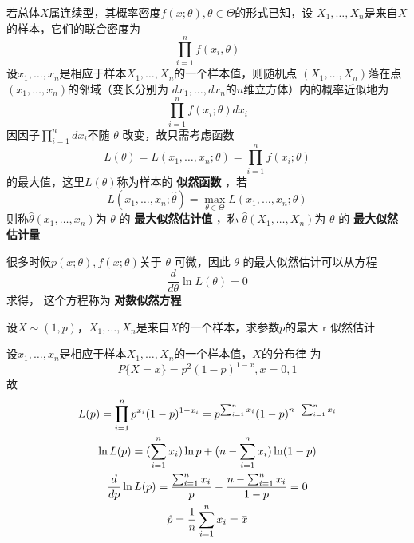 \documentclass[11pt]{article}
\begin{document}
若总体\(X\)属连续型，其概率密度\(f(x;\theta),\theta\in\Theta\)的形式已知，设
\(X_1,\dots,X_n\)是来自\(X\)的样本，它们的联合密度为
\begin{equation*}
\prod_{i=1}^nf(x_i,\theta)
\end{equation*}
设\(x_1,\dots,x_n\)是相应于样本\(X_1,\dots,X_n\)的一个样本值，则随机点
\((X_1,\dots,X_n)\)落在点\((x_1,\dots,x_n)\)的邻域（变长分别为
\(dx_1,\dots,dx_n\)的\(n\)维立方体）内的概率近似地为
\begin{equation*}
\prod_{i=1}^nf(x_i;\theta)dx_i
\end{equation*}
因因子\(\prod_{i=1}^ndx_i\)不随 \(\theta\) 改变，故只需考虑函数
\begin{equation*}
L(\theta)=L(x_1,\dots,x_n;\theta)=\prod_{i=1}^nf(x_i;\theta)
\end{equation*}
的最大值，这里\(L(\theta)\)称为样本的 \textbf{似然函数} ，若
\begin{equation*}
L(x_1,\dots,x_n;\hat{\theta})=\max_{\theta\in\Theta}L(x_1,\dots,x_n;\theta)
\end{equation*}
则称\(\hat{\theta}(x_1,\dots,x_n)\)为 \(\theta\) 的 \textbf{最大似然估计值} ，称
\(\hat{\theta}(X_1,\dots,X_n)\)为 \(\theta\) 的 \textbf{最大似然估计量}

很多时候\(p(x;\theta),f(x;\theta)\)关于 \(\theta\) 可微，因此 \(\theta\) 的最大似然估计可以从方程
\begin{equation*}
\frac{d}{d\theta}\ln L(\theta)=0
\end{equation*}
求得， 这个方程称为 \textbf{对数似然方程}

\begin{examplle}[]
设\(X\sim(1,p)\)，\(X_1,\dots,X_n\)是来自\(X\)的一个样本，求参数\(p\)的最大 r
似然估计

设\(x_1,\dots,x_n\)是相应于样本\(X_1,\dots,X_n\)的一个样本值，\(X\)的分布律
为
\begin{equation*}
P\{X=x\}=p^2(1-p)^{1-x},x=0,1
\end{equation*}
故
\begin{gather*}
L(p)=\prod_{i=1}^np^{x_i}(1-p)^{1-x_i}=p^{\sum_{i=1}^nx_i}(1-p)^{n-\sum_{i=1}^nx_i}\\
\ln L(p)=(\sum_{i=1}^nx_i)\ln p+(n-\sum_{i=1}^nx_i)\ln(1-p)\\
\frac{d}{dp}\ln L(p)=\frac{\sum_{i=1}^nx_i}{p}-\frac{n-\sum_{i=1}^nx_i}{1-p}=0\\
\hat{p}=\frac{1}{n}\sum_{i=1}^nx_i=\bbar{x}
\end{gather*}
\end{examplle}
\end{document}
